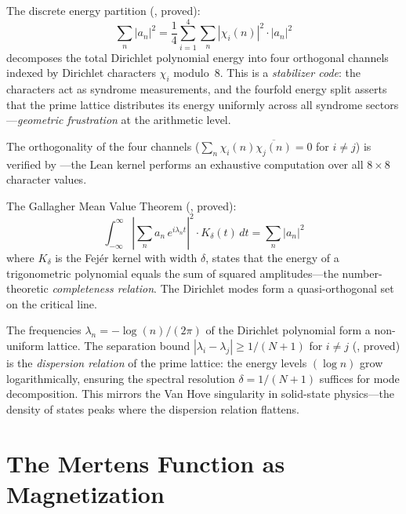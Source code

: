 \documentclass[11pt,a4paper]{article}
\begin{document}
\begin{correspondence}
The discrete energy partition (, proved):
\[
  \sum_n |a_n|^2 = \frac{1}{4}\sum_{i=1}^{4}
  \sum_{n} |\chi_i(n)|^2 \cdot |a_n|^2
\]
decomposes the total Dirichlet polynomial energy into four orthogonal
channels indexed by Dirichlet characters $\chi_i$ modulo~8. This is a
\emph{stabilizer code}: the characters act as syndrome measurements,
and the fourfold energy split asserts that the prime lattice distributes
its energy uniformly across all syndrome sectors---\emph{geometric
frustration} at the arithmetic level.

The orthogonality of the four channels ($\sum_n \chi_i(n)\overline{\chi_j(n)}
= 0$ for $i \neq j$) is verified by ---the Lean kernel
performs an exhaustive computation over all $8 \times 8$ character values.
\end{correspondence}

\begin{correspondence}
The Gallagher Mean Value Theorem (, proved):
\[
  \int_{-\infty}^{\infty} \left|\sum_n a_n\, e^{i\lambda_n t}\right|^2
  \cdot K_\delta(t)\,dt = \sum_n |a_n|^2
\]
where $K_\delta$ is the Fej\'er kernel with width $\delta$, states that
the energy of a trigonometric polynomial equals the sum of squared
amplitudes---the number-theoretic \emph{completeness relation}. The
Dirichlet modes form a quasi-orthogonal set on the critical line.
\end{correspondence}

\begin{correspondence}
The frequencies $\lambda_n = -\log(n)/(2\pi)$ of the Dirichlet
polynomial form a non-uniform lattice. The separation bound
$|\lambda_i - \lambda_j| \geq 1/(N+1)$ for $i \neq j$
(, proved) is the
\emph{dispersion relation} of the prime lattice: the energy levels
$(\log n)$ grow logarithmically, ensuring the spectral resolution
$\delta = 1/(N+1)$ suffices for mode decomposition. This mirrors
the Van Hove singularity in solid-state physics---the density of
states peaks where the dispersion relation flattens.
\end{correspondence}

\section{The Mertens Function as Magnetization}
\label{sec:mertens}
\end{document}
